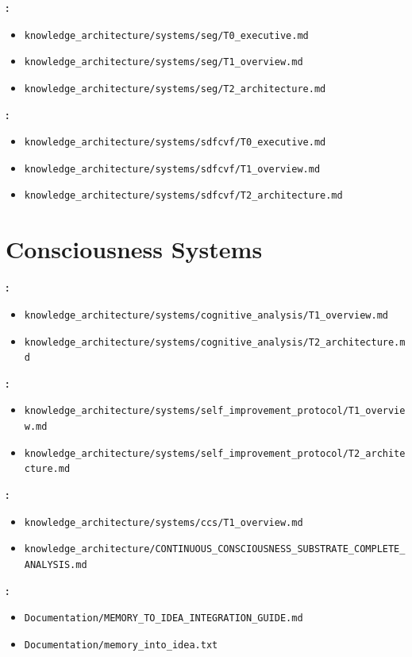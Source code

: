 \textbf{\seg:}
\begin{itemize}
    \item \texttt{knowledge\_architecture/systems/seg/T0\_executive.md}
    \item \texttt{knowledge\_architecture/systems/seg/T1\_overview.md}
    \item \texttt{knowledge\_architecture/systems/seg/T2\_architecture.md}
\end{itemize}

\textbf{\sdfcvf:}
\begin{itemize}
    \item \texttt{knowledge\_architecture/systems/sdfcvf/T0\_executive.md}
    \item \texttt{knowledge\_architecture/systems/sdfcvf/T1\_overview.md}
    \item \texttt{knowledge\_architecture/systems/sdfcvf/T2\_architecture.md}
\end{itemize}

\section*{Consciousness Systems}

\textbf{\cas:}
\begin{itemize}
    \item \texttt{knowledge\_architecture/systems/cognitive\_analysis/T1\_overview.md}
    \item \texttt{knowledge\_architecture/systems/cognitive\_analysis/T2\_architecture.md}
\end{itemize}

\textbf{\sis:}
\begin{itemize}
    \item \texttt{knowledge\_architecture/systems/self\_improvement\_protocol/T1\_overview.md}
    \item \texttt{knowledge\_architecture/systems/self\_improvement\_protocol/T2\_architecture.md}
\end{itemize}

\textbf{\ccs:}
\begin{itemize}
    \item \texttt{knowledge\_architecture/systems/ccs/T1\_overview.md}
    \item \texttt{knowledge\_architecture/CONTINUOUS\_CONSCIOUSNESS\_SUBSTRATE\_COMPLETE\_ANALYSIS.md}
\end{itemize}

\textbf{\mige:}
\begin{itemize}
    \item \texttt{Documentation/MEMORY\_TO\_IDEA\_INTEGRATION\_GUIDE.md}
    \item \texttt{Documentation/memory\_into\_idea.txt}
\end{itemize}

